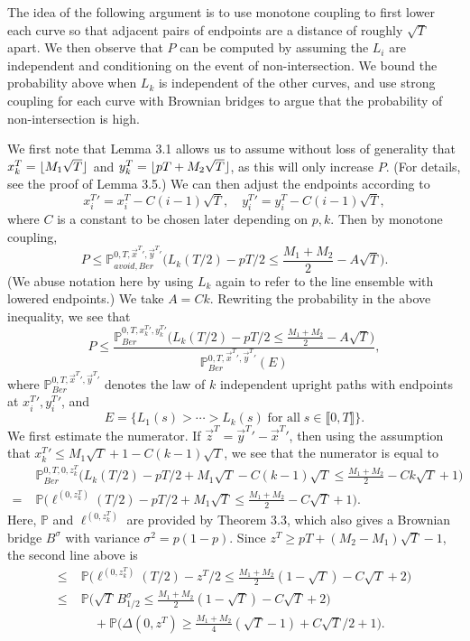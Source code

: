 \documentclass[12pt]{article}
\DeclarePairedDelimiter\floor{\lfloor}{\rfloor}
\begin{document}
	The idea of the following argument is to use monotone coupling to first lower each curve so that adjacent pairs of endpoints are a distance of roughly $\sqrt{T}$ apart. We then observe that $P$ can be computed by assuming the $L_i$ are independent and conditioning on the event of non-intersection. We bound the probability above when $L_k$ is independent of the other curves, and use strong coupling for each curve with Brownian bridges to argue that the probability of non-intersection is high.
	
	We first note that Lemma 3.1 allows us to assume without loss of generality that $x_k^T = \floor{M_1\sqrt{T}}$ and $y_k^T = \floor{pT + M_2\sqrt{T}}$, as this will only increase $P$. (For details, see the proof of Lemma 3.5.) We can then adjust the endpoints according to
	\[
	x_i^T{}' = x_i^T - C(i-1)\sqrt{T}, \quad y_i^T{}' = y_i^T - C(i-1)\sqrt{T},
	\]
	where $C$ is a constant to be chosen later depending on $p,k$. Then by monotone coupling,
	\[
	P \leq \mathbb{P}^{0,T,\vec{x}^T{}',\vec{y}^T{}'}_{avoid, Ber} \Big( L_k(T/2) - pT/2 \leq \frac{M_1+M_2}{2} - A\sqrt{T} \Big).
	\]
	(We abuse notation here by using $L_k$ again to refer to the line ensemble with lowered endpoints.) We take $A = Ck$. Rewriting the probability in the above inequality, we see that
	\[
	P \leq \frac{\mathbb{P}^{0,T,x_k^T{}',y_k^T{}'}_{Ber} \Big( L_k(T/2) - pT/2 \leq \frac{M_1+M_2}{2} - A\sqrt{T} \Big)}{\mathbb{P}^{0,T,\vec{x}^T{}',\vec{y}^T{}'}_{Ber}(E)},
	\]
	where $\mathbb{P}^{0,T,\vec{x}^T{}',\vec{y}^T{}'}_{Ber}$ denotes the law of $k$ independent upright paths with endpoints at $x_i^T{}', y_i^T{}'$, and
	\[
	E = \{L_1(s) > \cdots > L_k(s)\;\textrm{for all}\;s \in \llbracket 0, T\rrbracket \}.
	\]
	We first estimate the numerator. If $\vec{z}^T = \vec{y}^T{}' - \vec{x}^T{}'$, then using the assumption that $x_k^T{}' \leq M_1\sqrt{T} + 1 - C(k-1)\sqrt{T}$, we see that the numerator is equal to
	\begin{align*}
	&\mathbb{P}^{0,T,0,z_k^T}_{Ber} \Big( L_k(T/2) - pT/2 + M_1\sqrt{T} - C(k-1)\sqrt{T} \leq \frac{M_1+M_2}{2} - Ck\sqrt{T} + 1\Big) \\
	= \; & \mathbb{P} \Big( \ell^{(0,z^T_k)}(T/2) - pT/2 + M_1\sqrt{T} \leq \frac{M_1+M_2}{2} - C\sqrt{T} + 1\Big).
	\end{align*}
	Here, $\mathbb{P}$ and $\ell^{(0,z_k^T)}$ are provided by Theorem 3.3, which also gives a Brownian bridge $B^{\sigma}$ with variance $\sigma^2 = p(1-p)$. Since $z^T \geq pT + (M_2 - M_1)\sqrt{T} - 1$, the second line above is
	\begin{align*}
	\leq \; & \mathbb{P} \Big( \ell^{(0,z^T_k)}(T/2) - z^T/2 \leq \frac{M_1+M_2}{2}(1-\sqrt{T}) - C\sqrt{T} + 2\Big)\\
	\leq \; & \mathbb{P} \Big( \sqrt{T}\,B^{\sigma}_{1/2} \leq \frac{M_1+M_2}{2}(1-\sqrt{T}) - C\sqrt{T} + 2\Big)\\
	&\quad + \mathbb{P}\Big(\Delta(0,z^T) \geq \frac{M_1+M_2}{4}(\sqrt{T}-1) + C\sqrt{T}/2 + 1\Big).
	\end{align*}
\end{document}
